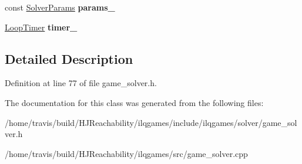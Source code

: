 \begin{DoxyCompactItemize}
\item 
const \hyperlink{structilqgames_1_1_solver_params}{Solver\+Params} {\bfseries params\+\_\+}\hypertarget{classilqgames_1_1_game_solver_adb70fc48a6420c1b516becd5c108a92a}{}\label{classilqgames_1_1_game_solver_adb70fc48a6420c1b516becd5c108a92a}

\item 
\hyperlink{classilqgames_1_1_loop_timer}{Loop\+Timer} {\bfseries timer\+\_\+}\hypertarget{classilqgames_1_1_game_solver_ae77a0725fdd98ec49f96ebf33d966650}{}\label{classilqgames_1_1_game_solver_ae77a0725fdd98ec49f96ebf33d966650}

\end{DoxyCompactItemize}


\subsection{Detailed Description}


Definition at line 77 of file game\+\_\+solver.\+h.



The documentation for this class was generated from the following files\+:\begin{DoxyCompactItemize}
\item 
/home/travis/build/\+H\+J\+Reachability/ilqgames/include/ilqgames/solver/game\+\_\+solver.\+h\item 
/home/travis/build/\+H\+J\+Reachability/ilqgames/src/game\+\_\+solver.\+cpp\end{DoxyCompactItemize}
